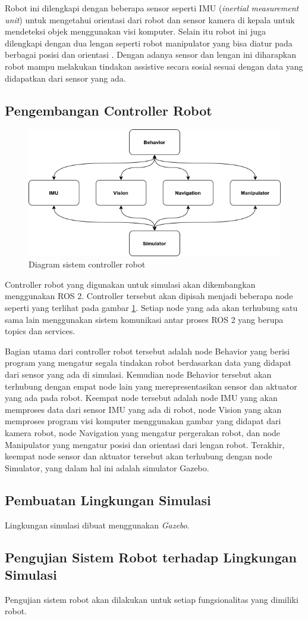 Robot ini dilengkapi dengan beberapa sensor seperti IMU (\emph{inertial measurement unit}) untuk mengetahui orientasi dari robot dan sensor kamera di kepala untuk mendeteksi objek menggunakan visi komputer.
Selain itu robot ini juga dilengkapi dengan dua lengan seperti robot manipulator yang bisa diatur pada berbagai posisi dan orientasi \citep{Iqbal2012}.
Dengan adanya sensor dan lengan ini diharapkan robot mampu melakukan tindakan assistive secara sosial sesuai dengan data yang didapatkan dari sensor yang ada.

\subsection{Pengembangan Controller Robot}

\begin{figure} [ht] \centering
	\includegraphics[scale=0.45]{gambar/robot-controller.png}
	\caption{Diagram sistem controller robot}
	\label{fig:RobotController}
\end{figure}

Controller robot yang digunakan untuk simulasi akan dikembangkan menggunakan ROS 2.
Controller tersebut akan dipisah menjadi beberapa node seperti yang terlihat pada gambar \ref{fig:RobotController}.
Setiap node yang ada akan terhubung satu sama lain menggunakan sistem komunikasi antar proses ROS 2 yang berupa topics dan services.

Bagian utama dari controller robot tersebut adalah node Behavior yang berisi program yang mengatur segala tindakan robot berdasarkan data yang didapat dari sensor yang ada di simulasi.
Kemudian node Behavior tersebut akan terhubung dengan empat node lain yang merepresentasikan sensor dan aktuator yang ada pada robot.
Keempat node tersebut adalah node IMU yang akan memproses data dari sensor IMU yang ada di robot, node Vision yang akan memproses program visi komputer menggunakan gambar yang didapat dari kamera robot, node Navigation yang mengatur pergerakan robot, dan node Manipulator yang mengatur posisi dan orientasi dari lengan robot.
Terakhir, keempat node sensor dan aktuator tersebut akan terhubung dengan node Simulator, yang dalam hal ini adalah simulator Gazebo.

\subsection{Pembuatan Lingkungan Simulasi}

Lingkungan simulasi dibuat menggunakan \emph{Gazebo}.

\subsection{Pengujian Sistem Robot terhadap Lingkungan Simulasi}

Pengujian sistem robot akan dilakukan untuk setiap fungsionalitas yang dimiliki robot.
